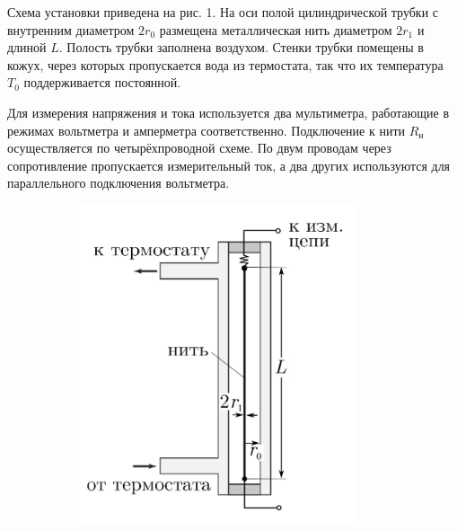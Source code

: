 \documentclass[14pt, a4paper]{report}
\begin{document}
Схема установки приведена на рис. 1. На оси полой цилиндрической трубки с внутренним диаметром $2r_0$ размещена металлическая нить диаметром $2r_1$ и длиной $L$. Полость трубки заполнена воздухом. Стенки трубки помещены в кожух, через которых пропускается вода из термостата, так что их температура $T_0$ поддерживается постоянной.

Для измерения напряжения и тока используется два мультиметра, работающие в режимах вольтметра и амперметра соответственно. Подключение к нити $R_н$ осуществляется по четырёхпроводной схеме. По двум проводам через сопротивление пропускается измерительный ток, а два других используются для параллельного подключения вольтметра.

\begin{figure}
\centering
\begin{subfigure}{.4\textwidth}
 \centering
 \includegraphics[width=1\linewidth]{terma6_00.png}
\end{subfigure}%
\begin{subfigure}{.4\textwidth}
\centering

\end{subfigure}
\end{figure}
\end{document}
